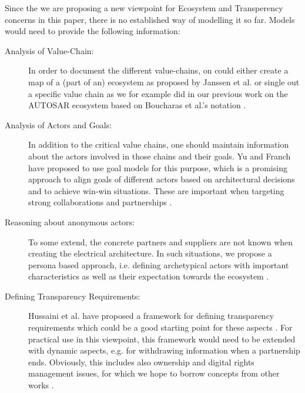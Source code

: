 Since the we are proposing a new viewpoint for Ecosystem and Transperency concerns in this paper, there is no established way of modelling it so far. 
Models would need to provide the following information:
\begin{description}
\item[Analysis of Value-Chain:] In order to document the different value-chains, on could either create a map of a (part of an) ecosystem as proposed by Janssen et al. \cite{Jansen2012b} or single out a specific value chain as we for example did in our previous work on the AUTOSAR ecosystem \cite{Soltani2015a} based on Boucharas et al.'s notation \cite{BJB2009}.
\item[Analysis of Actors and Goals:] In addition to the critical value chains, one should maintain information about the actors involved in those chains and their goals.
Yu and Franch have proposed to use goal models for this purpose, which is a promising approach to align goals of different actors based on architectural decisions and to achieve win-win situations. These are important when targeting strong collaborations and partnerships \cite{FSY2015}.
\item[Reasoning about anonymous actors:] To some extend, the concrete partners and suppliers are not known when creating the electrical architecture. 
In such situations, we propose a persona based approach, i.e. defining archetypical actors with important characteristics as well as their expectation towards the ecosystem \cite{Knauss2014c,Hammouda2015}.
\item[Defining Transparency Requirements:] Hussaini et al. have proposed a framework for defining transparency requirements which could be a good starting point for these aspects \cite{HSP+2016}. 
For practical use in this viewpoint, this framework would need to be extended with dynamic aspects, e.g. for withdrawing information when a partnership ends. 
Obviously, this includes also ownership and digital rights management issues, for which we hope to borrow concepts from other works \cite{Muller,Averbakh2014}.
\end{description}


